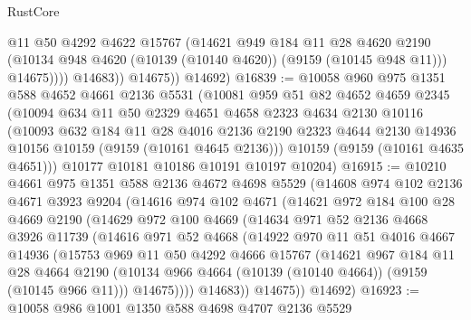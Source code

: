 \begin{lexlean}{RustCore}
\begin{coremodule}
                    @11
                    @50
                    @4292
                    @4622
                    @15767
                    (@14621
                      @949
                      @184
                      @11
                      @28
                      @4620
                      @2190
                      (@10134 @948 @4620 (@10139 (@10140 @4620)) (@9159 (@10145 @948 @11)))
                      @14675))))
              @14683))
          @14675))
      @14692)
@16839 := @10058
    @960
    @975
    @1351
    @588
    @4652
    @4661
    @2136
    @5531
    (@10081
      @959
      @51
      @82
      @4652
      @4659
      @2345
      (@10094
        @634
        @11
        @50
        @2329
        @4651
        @4658
        @2323
        @4634
        @2130
        @10116
        (@10093
          @632
          @184
          @11
          @28
          @4016
          @2136
          @2190
          @2323
          @4644
          @2130
          @14936
          @10156
          @10159
          (@9159 (@10161 @4645 @2136)))
        @10159
        (@9159 (@10161 @4635 @4651)))
      @10177
      @10181
      @10186
      @10191
      @10197
      @10204)
@16915 := @10210
    @4661
    @975
    @1351
    @588
    @2136
    @4672
    @4698
    @5529
    (@14608
      @974
      @102
      @2136
      @4671
      @3923
      @9204
      (@14616
        @974
        @102
        @4671
        (@14621
          @972
          @184
          @100
          @28
          @4669
          @2190
          (@14629
            @972
            @100
            @4669
            (@14634
              @971
              @52
              @2136
              @4668
              @3926
              @11739
              (@14616
                @971
                @52
                @4668
                (@14922
                  @970
                  @11
                  @51
                  @4016
                  @4667
                  @14936
                  (@15753
                    @969
                    @11
                    @50
                    @4292
                    @4666
                    @15767
                    (@14621
                      @967
                      @184
                      @11
                      @28
                      @4664
                      @2190
                      (@10134 @966 @4664 (@10139 (@10140 @4664)) (@9159 (@10145 @966 @11)))
                      @14675))))
              @14683))
          @14675))
      @14692)
@16923 := @10058 @986 @1001 @1350 @588 @4698 @4707 @2136 @5529

\end{coremodule}
\end{lexlean}

